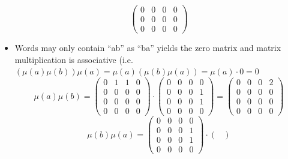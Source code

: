 \begin{itemize}
\[\begin{pmatrix}
                                        0 & 0 & 0 & 0 \\
                                        0 & 0 & 0 & 0 \\
                                        0 & 0 & 0 & 0
                                    \end{pmatrix}  \]
                \item Words may only contain ``ab'' as ``ba'' yields the zero matrix and matrix multiplication is associative (i.e. $(\mu(a)\mu(b))\mu(a) = \mu(a)(\mu(b)\mu(a)) = \mu(a) \cdot 0 = 0$
                    \[  \mu(a)\mu(b) = \begin{pmatrix}
                                        0 & 1 & 1 & 0 \\
                                        0 & 0 & 0 & 0 \\
                                        0 & 0 & 0 & 0 \\
                                        0 & 0 & 0 & 0
                                    \end{pmatrix} \cdot \begin{pmatrix}
                                        0 & 0 & 0 & 0 \\
                                        0 & 0 & 0 & 1 \\
                                        0 & 0 & 0 & 1 \\
                                        0 & 0 & 0 & 0
                                    \end{pmatrix} = \begin{pmatrix}
                                        0 & 0 & 0 & 2 \\
                                        0 & 0 & 0 & 0 \\
                                        0 & 0 & 0 & 0 \\
                                        0 & 0 & 0 & 0
                                    \end{pmatrix}
                                    \]
                    \[ \mu(b)\mu(a) = \begin{pmatrix}
                                        0 & 0 & 0 & 0 \\
                                        0 & 0 & 0 & 1 \\
                                        0 & 0 & 0 & 1 \\
                                        0 & 0 & 0 & 0
                                    \end{pmatrix} \cdot \begin{pmatrix}

\end{pmatrix}\]
\end{itemize}
